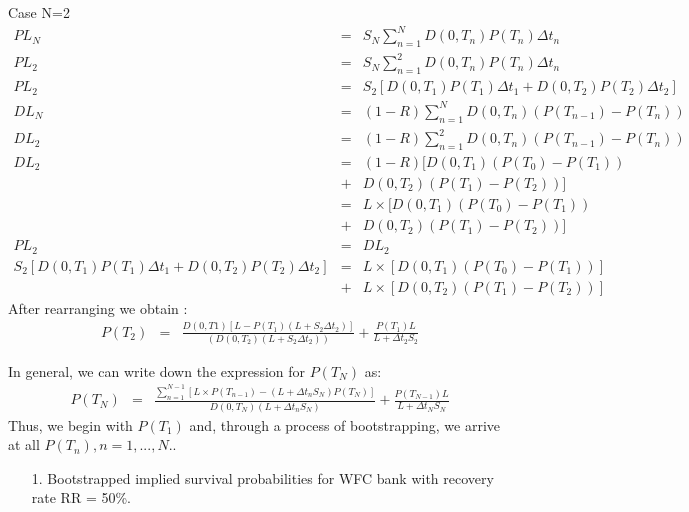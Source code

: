 \documentclass[11pt,oneside,a4paper, titlepage]{article}
\begin{document}
\begin{enumerate}
Case N=2
\begin{eqnarray*}
	PL_N &=& S_N \sum_{n=1}^{N} D(0, T_n) P(T_n) \Delta t_n\\
	PL_2 &=& S_N \sum_{n=1}^{2} D(0, T_n) P(T_n) \Delta t_n\\
	PL_2 &=& S_2 [D(0, T_1) P(T_1) \Delta t_1 + D(0, T_2) P(T_2) \Delta t_2]\\
	DL_N &=& (1-R) \sum_{n=1}^{N} D(0, T_n) (P(T_{n-1})- P(T_n)) \\
	DL_2 &=& (1-R) \sum_{n=1}^{2} D(0, T_n) (P(T_{n-1})- P(T_n)) \\	
	DL_2 &=& (1-R) [D(0, T_1) (P(T_0)- P(T_1)) \\
		 &+& D(0, T_2) (P(T_1)- P(T_2))] \\
	     &=& L \times [D(0, T_1) (P(T_0)- P(T_1)) \\
	     &+& D(0, T_2) (P(T_1)- P(T_2))] \\
	PL_2 &=& DL_2 \\
	S_2 [D(0, T_1) P(T_1) \Delta t_1 + D(0, T_2) P(T_2) \Delta t_2] &=& L \times [D(0, T_1) (P(T_0)- P(T_1))] \\
	    &+& L \times [D(0, T_2) (P(T_1)- P(T_2))]
\end{eqnarray*}
After rearranging we obtain :
\begin{eqnarray*}
	P(T_2) &=& \frac{D(0, T1) [L-P(T_1)(L+S_2\Delta t_2)]}{(D(0,T_2)(L+S_2\Delta t_2 ))} + \frac{P(T_1)L}{L+\Delta t_2 S_2}
\end{eqnarray*}

In general, we can write down the expression for \(P(T_N)\) as:
\begin{eqnarray*}
	P(T_N) &=& \frac{\sum_{n=1}^{N-1} [L\times P(T_{n-1})-(L+\Delta t_n S_N)P(T_N)]}{D(0,T_N)(L+\Delta t_n S_N)} + \frac{P(T_{N-1})L}{L+\Delta t_NS_N}
\end{eqnarray*}
Thus, we begin with \(P(T_1)\) and, through a process of bootstrapping, we arrive at all \(P(T_n), n=1,...,N.\).

\begin{enumerate}
	
\item[1.] Bootstrapped implied survival probabilities for WFC bank with recovery rate RR = 50\%.


\end{enumerate}
\end{enumerate}
\end{document}
